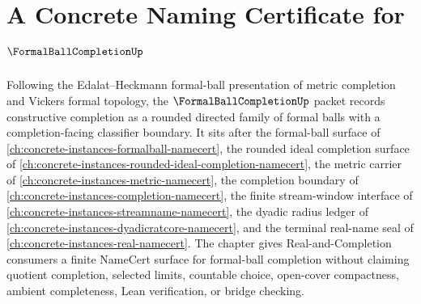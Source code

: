\chapter{A Concrete Naming Certificate for $\FormalBallCompletionUp$}
\label{ch:concrete-instances-formal-ball-completion-namecert}

Following the Edalat--Heckmann formal-ball presentation of metric completion and Vickers formal topology, the $\FormalBallCompletionUp$ packet records constructive completion as a rounded directed family of formal balls with a completion-facing classifier boundary. It sits after the formal-ball surface of \autoref{ch:concrete-instances-formalball-namecert}, the rounded ideal completion surface of \autoref{ch:concrete-instances-rounded-ideal-completion-namecert}, the metric carrier of \autoref{ch:concrete-instances-metric-namecert}, the completion boundary of \autoref{ch:concrete-instances-completion-namecert}, the finite stream-window interface of \autoref{ch:concrete-instances-streamname-namecert}, the dyadic radius ledger of \autoref{ch:concrete-instances-dyadicratcore-namecert}, and the terminal real-name seal of \autoref{ch:concrete-instances-real-namecert}. The chapter gives Real-and-Completion consumers a finite NameCert surface for formal-ball completion without claiming quotient completion, selected limits, countable choice, open-cover compactness, ambient completeness, Lean verification, or bridge checking.


